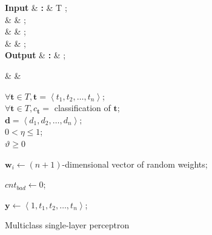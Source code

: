 \documentclass[twoside]{IEEEtran}
\begin{document}
\begin{figure}[!t]
    \centering
    \setlength{\intextsep}{0pt}

    \begin{algorithm}[H]
        \caption{Multiclass single-layer perceptron}

        \begin{flalign*}
            \setlength{\arraycolsep}{0pt}
            \begin{matrix*}[l]
                \textbf{Input}  & \textbf{: } & T ;          \\
                \text{}         &           &  ;           \\
                \text{}         &           & \eta {};                   \\
                \text{}         &           & \vartheta {}; \\
                \textbf{Output} & \textbf{: } &  ;
            \end{matrix*} &  &
        \end{flalign*}
        \begin{algorithmic}
            \Require%
            \( \forall \mathbf{t} \in T, \mathbf{t} = \left<t_1, t_2, \dots, t_n\right> \); \\
            \( \forall \mathbf{t} \in T, c_\mathbf{t} = \) classification of \( \mathbf{t} \); \\
            \( \mathbf{d} = \left<d_1, d_2, \dots, d_n\right>; \) \\
            \( 0 < \eta \leq 1 \); \\
            \( \vartheta \geq 0 \)

            \State%

                \State%
                \( \mathbf{w}_i \gets \left(n + 1\right) \)-dimensional vector of random weights;
            \EndFor%

            \State{}
                \State%
                \( cnt_{bad} \gets 0 \);

                    \State%
                    \( \mathbf{y} \gets \left<1, t_1, t_2, \dots, t_n\right> \);


\end{algorithmic}
\end{algorithm}
\end{figure}
\end{document}
